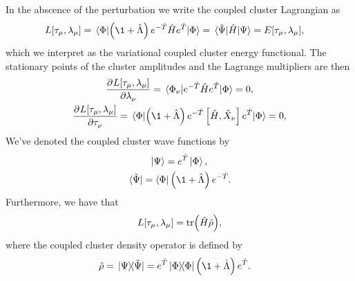             In the abscence of the perturbation we write the coupled cluster
            Lagrangian as
            \begin{align}
                L[\clustamp_{\mu}, \clustlamp_{\mu}]
                &= \mel*{\slat}{
                    \para{\1 + \clustl}
                    e^{-\clust}
                    \hamil
                    e^{\clust}
                }{\slat}
                = \mel*{\tilde{\Psi}}{\hamil}{\Psi}
                = E[\clustamp_{\mu}, \clustlamp_{\mu}],
                \label{eq:cc-energy-functional}
            \end{align}
            which we interpret as the variational coupled cluster energy
            functional.
            The stationary points of the cluster amplitudes and the Lagrange
            multipliers are then
            \begin{gather}
                \dpd[]{L[\clustamp_{\mu},\clustlamp_{\mu}]}
                {\clustlamp_{\nu}}
                = \mel{\slat_{\nu}}{
                    e^{-\clust}\hamil e^{\clust}
                }{\slat}
                = 0,
                \label{eq:cc-lagrangian-tau}
                \\
                \dpd[]{L[\clustamp_{\mu}, \clustlamp_{\mu}]}
                {\clustamp_{\nu}}
                = \mel{\slat}{
                    \para{\1 + \clustl}
                    e^{-\clust}
                    \com{\hamil}{\hat{X}_{\nu}}
                    e^{\clust}
                }{\slat}
                \label{eq:cc-lagrangian-lambda}
                = 0,
            \end{gather}
            We've denoted the coupled cluster wave functions by
            \begin{gather}
                \ket{\Psi} = e^{\clust}\ket{\slat}, \\
                \bra*{\tilde{\Psi}} = \bra{\slat}\para{\1 + \clustl}e^{-\clust}.
            \end{gather}
            Furthermore, we have that
            \begin{align}
                L[\tau_{\mu}, \lambda_{\mu}]
                = \tr(\hat{H}\hat{\rho}),
            \end{align}
            where the coupled cluster density operator is defined by
            \cite{kvaal2013variational}
            \begin{align}
                \density
                &= \dyad*{\Psi}{\tilde{\Psi}}
                = e^{\clust}\dyad{\slat}{\slat}\para{\1 + \clustl}e^{\clust}.
                \label{eq:cc-density-operator}
            \end{align}

